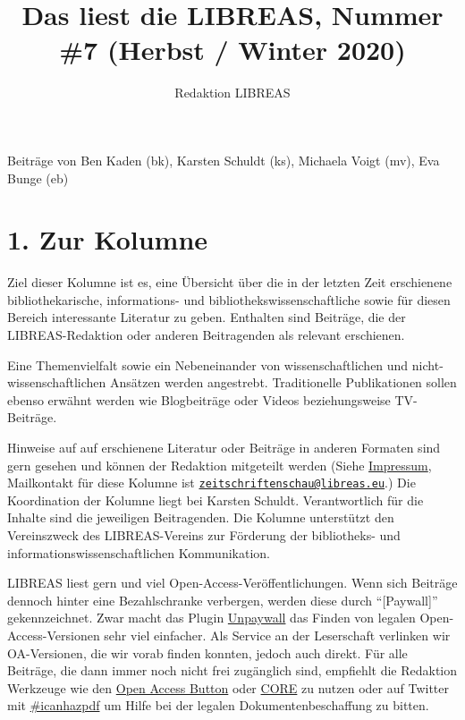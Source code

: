 \documentclass[a4paper,
fontsize=11pt,
oneside,
numbers=noperiodatend,
parskip=half-,
bibliography=totoc,
final
]{scrartcl}
\title{\LARGE{Das liest die LIBREAS, Nummer \#7 (Herbst / Winter 2020)}}%
\author{Redaktion LIBREAS} %
\date{}
\begin{document}
\maketitle
\thispagestyle{fancyplain} 


Beiträge von Ben Kaden (bk), Karsten Schuldt (ks), Michaela Voigt (mv),
Eva Bunge (eb)

\hypertarget{zur-kolumne}{%
\section{1. Zur Kolumne}\label{zur-kolumne}}

Ziel dieser Kolumne ist es, eine Übersicht über die in der letzten Zeit
erschienene bibliothekarische, informations- und
bibliothekswissenschaftliche sowie für diesen Bereich interessante
Literatur zu geben. Enthalten sind Beiträge, die der LIBREAS-Redaktion
oder anderen Beitragenden als relevant erschienen.

Eine Themenvielfalt sowie ein Nebeneinander von wissenschaftlichen und
nicht-wissenschaft\-lichen Ansätzen werden angestrebt. Traditionelle
Publikationen sollen ebenso erwähnt werden wie Blogbeiträge oder Videos
beziehungsweise TV-Beiträge.

Hinweise auf auf erschienene Literatur oder Beiträge in anderen Formaten
sind gern gesehen und können der Redaktion mitgeteilt werden (Siehe
\href{http://libreas.eu/about/}{Impressum}, Mailkontakt für diese
Kolumne ist
\href{mailto:zeitschriftenschau@libreas.eu}{\nolinkurl{zeitschriftenschau@libreas.eu}}.)
Die Koordination der Kolumne liegt bei Karsten Schuldt. Verantwortlich
für die Inhalte sind die jeweiligen Beitragenden. Die Kolumne
unterstützt den Vereinszweck des LIBREAS-Vereins zur Förderung der
bibliotheks- und informationswissenschaftlichen Kommunikation.

LIBREAS liest gern und viel Open-Access-Veröffentlichungen. Wenn sich
Beiträge dennoch hinter eine Bezahlschranke verbergen, werden diese
durch \enquote{{[}Paywall{]}} gekennzeichnet. Zwar macht das Plugin
\href{http://unpaywall.org/}{Unpaywall} das Finden von legalen
Open-Access-Versionen sehr viel einfacher. Als Service an der
Leserschaft verlinken wir OA-Versionen, die wir vorab finden konnten,
jedoch auch direkt. Für alle Beiträge, die dann immer noch nicht frei
zugänglich sind, empfiehlt die Redaktion Werkzeuge wie den
\href{https://openaccessbutton.org/}{Open Access Button} oder
\href{https://core.ac.uk/services/discovery/}{CORE} zu nutzen oder auf
Twitter mit
\href{https://twitter.com/hashtag/icanhazpdf?src=hash}{\#icanhazpdf} um
Hilfe bei der legalen Dokumentenbeschaffung zu bitten.
\end{document}
